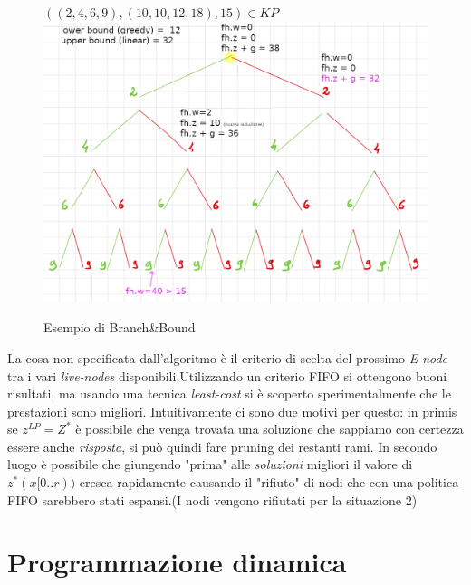 \documentclass[a4paper]{article}
\begin{document}
\begin{adjustwidth}{.8cm}{0cm}
\begin{itemize}
	\end{itemize}
	\begin{figure}[!ht]
\centering
\textbf{$((2,4,6,9),(10,10,12,18),15) \in KP$}
\includegraphics[width=1\textwidth]{./img/C14_BB_manuale.png}
\caption{Esempio di Branch\&Bound} \label{FIG:C14_BB_manuale}
\end{figure}
	La cosa non specificata dall'algoritmo è il criterio di scelta del prossimo \textit{E-node} tra i vari \textit{live-nodes} disponibili.Utilizzando un criterio FIFO si ottengono buoni risultati, ma usando una tecnica \emph{least-cost} si è scoperto sperimentalmente che le prestazioni sono migliori.
	Intuitivamente ci sono due motivi per questo: in primis se $z^{LP} = Z^*$ è possibile che venga trovata una soluzione che sappiamo con certezza essere anche \textit{risposta}, si può quindi fare pruning dei restanti rami.
	In secondo luogo è possibile che giungendo "prima" alle \textit{soluzioni} migliori il valore di $z^*(x[0..r))$ cresca rapidamente causando il "rifiuto" di nodi che con una politica FIFO sarebbero stati espansi.(I nodi vengono rifiutati per la situazione 2)
\end{adjustwidth}
\section{Programmazione dinamica}
\end{document}

